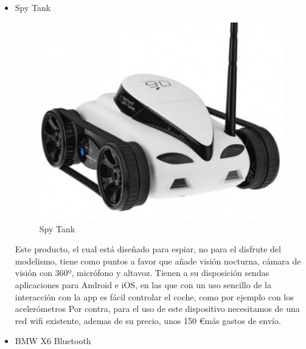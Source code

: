 \documentclass{pclass}
\begin{document}
\begin{itemize}
    \item Spy Tank


\begin{figure}[H]
  \centering
    \includegraphics[width=1.1\textwidth]{img/producto1}
  \caption{Spy Tank}
  \label{fig:SpyTank}
\end{figure}



Este producto, el cual está diseñado para espiar, no para el disfrute del modelismo, tiene como puntos a favor que añade visión nocturna, cámara de visión con 360º, micrófono y altavoz. Tienen a su disposición sendas aplicaciones para Android e iOS, en las que con un uso sencillo de la interacción con la app es fácil controlar el coche, como por ejemplo con los acelerómetros Por contra, para el uso de este dispositivo necesitamos de una red wifi existente, ademas de su precio, unos 150 \euro más gastos de envío.



    \item BMW X6 Bluetooth
\end{itemize}
\end{document}
